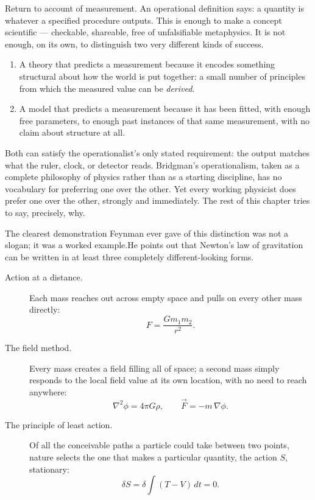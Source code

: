 Return to  account of measurement. An operational definition says: a quantity
is whatever a specified procedure outputs. This is enough to make a concept
scientific --- checkable, shareable, free of unfalsifiable metaphysics. It is
not enough, on its own, to distinguish two very different kinds of success.
\begin{enumerate}
\item A theory that predicts a measurement because it encodes something
    structural about how the world is put together: a small number of
        principles from which the measured value can be \emph{derived}.
\item A model that predicts a measurement because it has been fitted, with
    enough free parameters, to enough past instances of that same measurement,
        with no claim about structure at all.
\end{enumerate}

Both can satisfy the operationalist's only stated requirement: the output
matches what the ruler, clock, or detector reads. Bridgman's operationalism,
taken as a complete philosophy of physics rather than as a starting discipline,
has no vocabulary for preferring one over the other. Yet every working
physicist does prefer one over the other, strongly and immediately. The rest of
this chapter tries to say, precisely, why.

The clearest demonstration Feynman ever gave of this distinction was not a
slogan; it was a worked example.He points out that Newton's law of gravitation
can be written in at least three completely different-looking forms.

\begin{description}
\item[Action at a distance.] Each mass reaches out across empty space and pulls
    on every other mass directly:
\[
  F = \frac{G m_1 m_2}{r^2}.
\]
\item[The field method.] Every mass creates a field filling all of space; a
    second mass simply responds to the local field value at its own location,
        with no need to reach anywhere:
\[
  \nabla^2 \phi = 4\pi G \rho, \qquad \vec F = -m\,\nabla \phi.
\]
\item[The principle of least action.] Of all the conceivable paths a particle
    could take between two points, nature selects the one that makes a
        particular quantity, the action $S$, stationary:
\[
  \delta S = \delta\!\int (T - V)\, dt = 0.
\]
\end{description}


